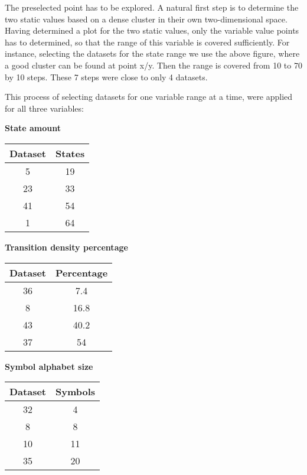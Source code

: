 The preselected point has to be explored. A natural first step is to determine the two static values based on a dense cluster in their own two-dimensional space. Having determined a plot for the two static values, only the variable value points has to determined, so that the range of this variable is covered sufficiently. For instance, selecting the datasets for the state range we use the above figure, where a good cluster can be found at point x/y. Then the range is covered from 10 to 70 by 10 steps. These 7 steps were close to only 4 datasets.  

This process of selecting datasets for one variable range at a time, were applied for all three variables:


\begin{table}
\centering
{
\textbf{State amount}

\begin{tabular}{|c|c|}
  \hline
  Dataset 	& States \\  \hline
  5 			& 19 \\
  23 			& 33 \\
  41			& 54 \\
  1				& 64 \\ \hline
\end{tabular}

\textbf{Transition density percentage}

\begin{tabular}{|c|c|}
  \hline
  Dataset 	& Percentage \\  \hline
  36 			& 7.4 \\
  8 			& 16.8 \\
  43			& 40.2 \\
  37			& 54 \\ \hline
\end{tabular}


\textbf{Symbol alphabet size}

\begin{tabular}{|c|c|}
  \hline
  Dataset 	& Symbols \\  \hline
  32 			& 4 \\
  8 			& 8 \\
  10			& 11 \\
  35			& 20 \\ \hline
\end{tabular}
}
\end{table}